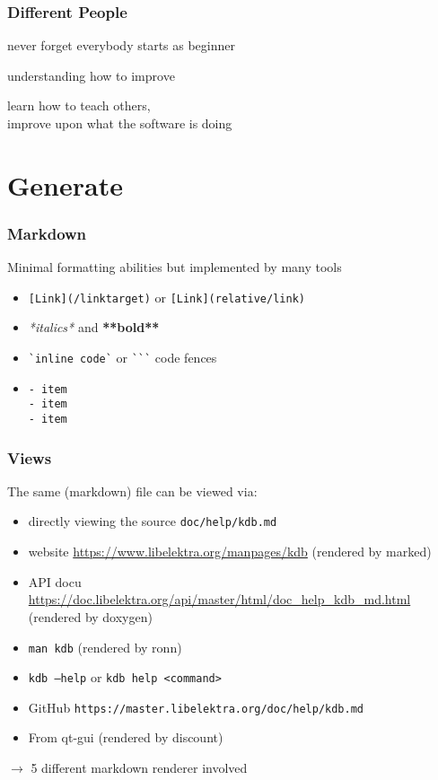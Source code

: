 \begin{frame}
	\frametitle{Different People}

	\begin{description}[<+-| alert@+>]
	\item[beginners] never forget everybody starts as beginner
	\item[advanced] understanding how to improve
	\item[expert] learn how to teach others, \\
		improve upon what the software is doing
	\end{description}
\end{frame}

\section{Generate}

\begin{frame}[fragile]
	\frametitle{Markdown}

	Minimal formatting abilities but implemented by many tools

	\begin{itemize}[<+-| alert@+>]
	\item \texttt{[Link](/linktarget)} or \texttt{[Link](relative/link)}
	\item \textit{*italics*} and \textbf{**bold**}
	\item \verb+`inline code`+ or \verb+```+ code fences
	\item \begin{verbatim}- item
- item
- item\end{verbatim}
	\end{itemize}
\end{frame}

\begin{frame}
	\frametitle{Views}

	The same (markdown) file can be viewed via:
	
	\begin{itemize}[<+-| alert@+>]
	\item directly viewing the source \texttt{doc/help/kdb.md}
	\item website \url{https://www.libelektra.org/manpages/kdb} (rendered by marked)
	\item API docu \url{https://doc.libelektra.org/api/master/html/doc_help_kdb_md.html} (rendered by doxygen)
	\item \texttt{man kdb} (rendered by ronn)
	\item \texttt{kdb --help} or \texttt{kdb help <command>}
	\item GitHub \texttt{https://master.libelektra.org/doc/help/kdb.md}
	\item From qt-gui (rendered by discount)
	\end{itemize}

	\pause[\thebeamerpauses]  %

	$\rightarrow$ 5 different markdown renderer involved
\end{frame}

